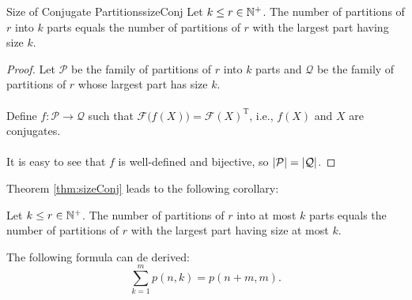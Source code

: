 \documentclass[math]{amznotes}
\theoremstyle{remark}
\begin{document}
\begin{thmbox}{Size of Conjugate Partitions}{sizeConj}
    Let $k \leq r \in \mathbb{N}^+$. The number of partitions of $r$ into $k$ parts equals the number of partitions of $r$ with the largest part having size $k$.
    \tcblower   
    \begin{proof}
        Let $\mathcal{P}$ be the family of partitions of $r$ into $k$ parts and $\mathcal{Q}$ be the family of partitions of $r$ whose largest part has size $k$.
        \\\\
        Define $f \colon \mathcal{P} \to \mathcal{Q}$ such that $\mathcal{F}\bigl(f(X)\bigr) = \mathcal{F}(X)^{\mathrm{T}}$, i.e., $f(X)$ and $X$ are conjugates.
        \\\\
        It is easy to see that $f$ is well-defined and bijective, so ${\left\lvert {\mathcal{P}} \right\rvert} = {\left\lvert {\mathcal{Q}} \right\rvert}$.
    \end{proof}
\end{thmbox}
Theorem \ref{thm:sizeConj} leads to the following corollary:
\begin{corbox}{}{}
    Let $k \leq r \in \mathbb{N}^+$. The number of partitions of $r$ into at most $k$ parts equals the number of partitions of $r$ with the largest part having size at most $k$.
\end{corbox}
The following formula can de derived:
\begin{equation*}
    \sum_{k = 1}^{m}p(n, k) = p(n + m, m).
\end{equation*}
\end{document}
